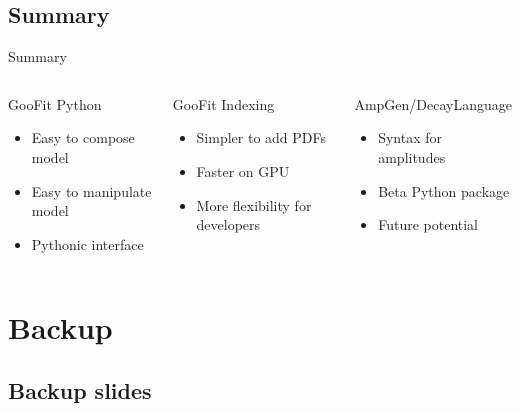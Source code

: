 \documentclass[aspectratio=169, smaller]{beamer}
\begin{document}
\subsection{Summary}
\begin{frame}{Summary}
    \begin{columns}[t]
        \begin{block}{GooFit Python}
            \begin{itemize}
                \item Easy to compose model
                \item Easy to manipulate model
                \item Pythonic interface
            \end{itemize}
        \end{block}
        \begin{block}{GooFit Indexing}
            \begin{itemize}
                \item Simpler to add PDFs
                \item Faster on GPU
                \item More flexibility for developers
            \end{itemize}
        \end{block}
        \begin{block}{AmpGen/DecayLanguage}
            \begin{itemize}
                \item Syntax for amplitudes
                \item Beta Python package
                \item Future potential
            \end{itemize}
        \end{block}
    \end{columns}
\end{frame}


\backupbegin
\section{Backup}

\subsection{Backup slides}


\backupend
\end{document}

